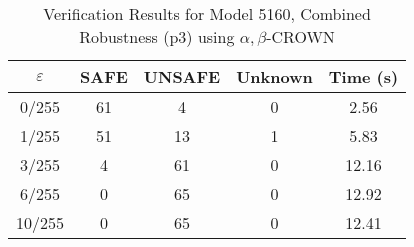 \begin{table}[htbp]
\centering
\caption{Verification Results for Model 5160, Combined Robustness (p3) using $\alpha,\beta$-CROWN}
\label{tab:model5160_p3_abcrown}
\begin{tabular}{|c|c|c|c|c|}
\hline
$\varepsilon$ & SAFE & UNSAFE & Unknown & Time (s) \\ \hline
0/255 & 61 & 4 & 0 & 2.56 \\ \hline
1/255 & 51 & 13 & 1 & 5.83 \\ \hline
3/255 & 4 & 61 & 0 & 12.16 \\ \hline
6/255 & 0 & 65 & 0 & 12.92 \\ \hline
10/255 & 0 & 65 & 0 & 12.41 \\ \hline
\end{tabular}
\end{table}
